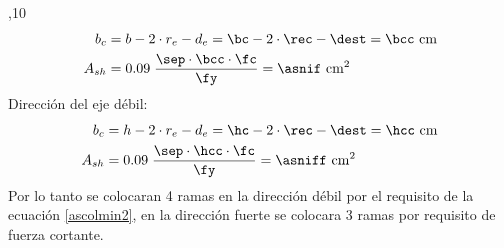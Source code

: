 \FPset\sep{10}
\begin{align*}
b_{c}&=b-2\cdot r_{e}-d_{e}=\bc-2\cdot\rec-\dest=\bcc \mathrm{~cm}\\
A_{sh} &=0.09\; \frac{\sep\cdot \bcc\cdot \fc}{\fy}=\asnif\mathrm{~cm^2}
\end{align*}
Dirección del eje débil:
\begin{align*}
b_{c}&=h-2\cdot r_{e}-d_{e}=\hc-2\cdot\rec-\dest=\hcc \mathrm{~cm}\\
A_{sh} &=0.09\; \frac{\sep\cdot \hcc\cdot \fc}{\fy}=\asniff \mathrm{~cm^2}
\end{align*}
\noindent
Por lo tanto se colocaran 4 ramas en la dirección débil por el requisito de la ecuación \ref{ascolmin2}, en la dirección fuerte se colocara 3 ramas por requisito de fuerza cortante. 
